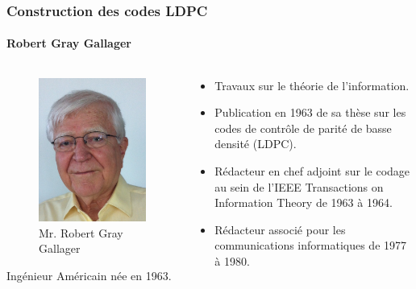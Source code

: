 \documentclass{beamer}
\begin{document}
    \begin{frame}
        \frametitle{Construction des codes LDPC}
        \framesubtitle{Robert Gray Gallager}
        \begin{columns}
            \begin{column}{5cm}
                \begin{figure}[!h]
                    \centering
                    \includegraphics[scale=0.2]{Robert_Gallager.jpg} 
                    \caption{Mr. Robert Gray Gallager} 
                    \label{fig:gallager}
                \end{figure}
                Ingénieur Américain née en 1963.
            \end{column}
            
            \begin{column}{5cm}
                \begin{itemize}
                    \item Travaux sur le théorie de l'information.
                    \item Publication en 1963 de sa thèse sur les codes de contrôle de parité de basse densité (LDPC).
                    \item Rédacteur en chef adjoint sur le codage au sein de l’IEEE Transactions on Information Theory de 1963 à 1964.
                    \item Rédacteur associé pour les communications informatiques de 1977 à 1980.
                \end{itemize}
            \end{column}
            \end{columns}
    \end{frame}
\end{document}
